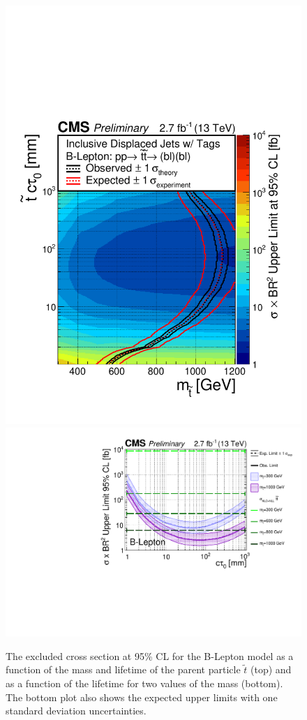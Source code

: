 \begin{figure}[tb]
\begin{center}
\includegraphics[width=.75\textwidth]{figures/pas//RESULT/UNBLINDED_LIMITS/B-Lepton2D.pdf}
\includegraphics[width=.75\textwidth]{figures/pas//RESULT/UNBLINDED_LIMITS/B-Lepton.pdf}
\caption{The excluded cross section at 95\% CL for the B-Lepton model
  as a function of the mass and lifetime of the parent particle
  $\tilde{t}$ (top) and as a function of the lifetime for two values
  of the mass (bottom).  The bottom plot also shows the expected upper
  limits with one standard deviation
  uncertainties.\label{fig:dsusy_limit_lepton}}
\end{center}
\end{figure}

